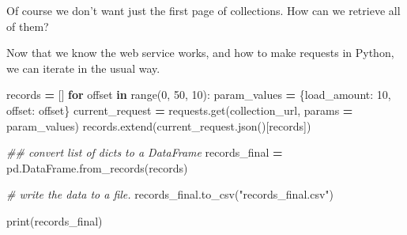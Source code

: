 \documentclass[
]{book}
\newenvironment{Shaded}{\begin{snugshade}}{\end{snugshade}}
\newcommand{\BuiltInTok}[1]{#1}
\newcommand{\CommentTok}[1]{\textcolor[rgb]{0.56,0.35,0.01}{\textit{#1}}}
\newcommand{\ControlFlowTok}[1]{\textcolor[rgb]{0.13,0.29,0.53}{\textbf{#1}}}
\newcommand{\DecValTok}[1]{\textcolor[rgb]{0.00,0.00,0.81}{#1}}
\newcommand{\KeywordTok}[1]{\textcolor[rgb]{0.13,0.29,0.53}{\textbf{#1}}}
\newcommand{\NormalTok}[1]{#1}
\newcommand{\OperatorTok}[1]{\textcolor[rgb]{0.81,0.36,0.00}{\textbf{#1}}}
\newcommand{\StringTok}[1]{\textcolor[rgb]{0.31,0.60,0.02}{#1}}
\begin{document}
Of course we don't want just the first page of collections. How can we retrieve all of them?

Now that we know the web service works, and how to make requests in Python, we can iterate in the usual way.

\begin{Shaded}
\begin{Highlighting}[]
\NormalTok{records }\OperatorTok{=}\NormalTok{ []}
\ControlFlowTok{for}\NormalTok{ offset }\KeywordTok{in} \BuiltInTok{range}\NormalTok{(}\DecValTok{0}\NormalTok{, }\DecValTok{50}\NormalTok{, }\DecValTok{10}\NormalTok{):}
\NormalTok{    param\_values }\OperatorTok{=}\NormalTok{ \{}\StringTok{\textquotesingle{}load\_amount\textquotesingle{}}\NormalTok{: }\DecValTok{10}\NormalTok{, }\StringTok{\textquotesingle{}offset\textquotesingle{}}\NormalTok{: offset\}}
\NormalTok{    current\_request }\OperatorTok{=}\NormalTok{ requests.get(collection\_url, params }\OperatorTok{=}\NormalTok{ param\_values)}
\NormalTok{    records.extend(current\_request.json()[}\StringTok{\textquotesingle{}records\textquotesingle{}}\NormalTok{])}
\end{Highlighting}
\end{Shaded}

\begin{Shaded}
\begin{Highlighting}[]
\CommentTok{\#\# convert list of dicts to a \textasciigrave{}DataFrame\textasciigrave{}}
\NormalTok{records\_final }\OperatorTok{=}\NormalTok{ pd.DataFrame.from\_records(records)}
\end{Highlighting}
\end{Shaded}

\begin{Shaded}
\begin{Highlighting}[]
\CommentTok{\# write the data to a file.}
\NormalTok{records\_final.to\_csv(}\StringTok{"records\_final.csv"}\NormalTok{)}
\end{Highlighting}
\end{Shaded}

\begin{Shaded}
\begin{Highlighting}[]
\BuiltInTok{print}\NormalTok{(records\_final)}
\end{Highlighting}
\end{Shaded}
\end{document}

